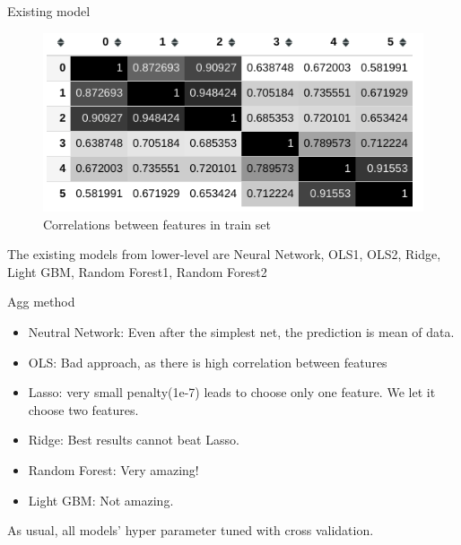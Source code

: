 \documentclass{beamer}
\begin{document}
\begin{frame}{Existing model}
    \begin{figure}[ht]
        \centering
        \includegraphics[width=0.7\linewidth,height=0.4\linewidth]{agg_1.png}
        \caption{Correlations between features in train set}
        \label{fig:label}
    \end{figure}
    
    The existing models from lower-level are Neural Network, OLS1, OLS2,  Ridge, Light GBM, Random Forest1, Random Forest2  
\end{frame}

\begin{frame}{Agg method}
\begin{itemize}
    \item Neutral Network: Even after the simplest net, the prediction is mean of data.
    \item OLS: Bad approach, as there is high correlation between features
    \item Lasso: very small penalty(1e-7) leads to choose only one feature. We let it choose two features.
    \item Ridge: Best results cannot beat Lasso.
    \item Random Forest: Very amazing!
    \item Light GBM: Not amazing.
\end{itemize}
As usual, all models' hyper parameter tuned with cross validation.
\end{frame}
\end{document}
